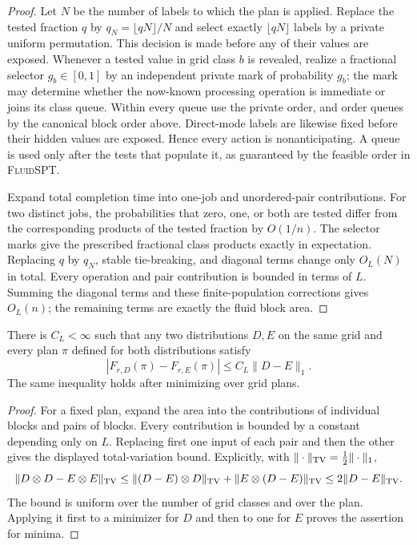 \begin{proof}
Let $N$ be the number of labels to which the plan is applied.  Replace the
tested fraction $q$ by $q_N=\lfloor qN\rfloor/N$ and select exactly
$\lfloor qN\rfloor$ labels by a private uniform permutation.  This decision
is made before any of their values are exposed.  Whenever a tested value in
grid class $b$ is revealed, realize a fractional selector $g_b\in[0,1]$ by
an independent private mark of probability $g_b$; the mark may determine
whether the now-known processing operation is immediate or joins its
class queue.  Within every queue use the private order, and order queues by
the canonical block order above.  Direct-mode labels are likewise fixed
before their hidden values are exposed.  Hence every action is
nonanticipating.  A queue is used only after the tests that populate it, as
guaranteed by the feasible order in \textsc{FluidSPT}.

Expand total completion time into one-job and unordered-pair contributions.
For two distinct jobs, the probabilities that zero, one, or both are tested
differ from the corresponding products of the tested fraction by $O(1/n)$.
The selector marks give the prescribed fractional class products exactly in
expectation.  Replacing $q$ by $q_N$, stable tie-breaking, and diagonal terms
change only $O_L(N)$ in total.  Every operation and pair contribution is
bounded in terms of $L$.
Summing the diagonal terms and these finite-population corrections gives
$O_L(n)$; the remaining terms are exactly the fluid block area.
\end{proof}

\begin{claim}
\label{clm:common-template-stability}
There is $C_L<\infty$ such that any two distributions $D,E$ on the same
grid and every plan $\pi$ defined for both distributions satisfy
\begin{equation}
 |F_{r,D}(\pi)-F_{r,E}(\pi)|
 \le C_L\|D-E\|_1.
 \label{eq:common-template-stability}
\end{equation}
The same inequality holds after minimizing over grid plans.
\end{claim}

\begin{proof}
For a fixed plan, expand the area into the contributions of individual
blocks and pairs of blocks.  Every contribution is bounded by a constant
depending only on $L$.  Replacing first one input of each pair and then the
other gives the displayed total-variation bound.  Explicitly, with
$\|\cdot\|_{\rm TV}=\frac12\|\cdot\|_1$,
\begin{equation}
 \|D\otimes D-E\otimes E\|_{\rm TV}
 \le \|(D-E)\otimes D\|_{\rm TV}
     +\|E\otimes(D-E)\|_{\rm TV}
 \le2\|D-E\|_{\rm TV}.
 \label{eq:common-product-tv}
\end{equation}
The bound is uniform over the number of grid classes and over the plan.
Applying it first to a
minimizer for $D$ and then to one for $E$ proves the assertion for minima.
\end{proof}

